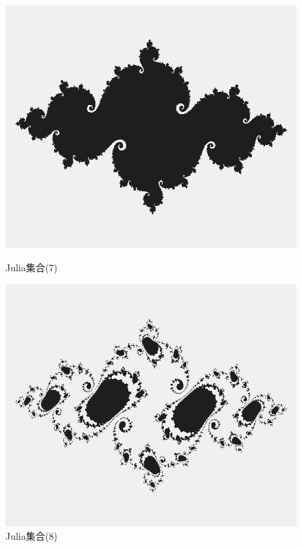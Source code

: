 \documentclass[dvipdfmx]{jsarticle}
\theoremstyle{definition}
\begin{document}
\begin{figure}[ht]
\begin{minipage}{0.5\hsize}
    \begin{center}
        \includegraphics[scale=0.21]{figure/julia_set7.png}
    \end{center}
    \caption{Julia集合(7)}
\end{minipage}
\begin{minipage}{0.49\hsize}
    \begin{center}
        \includegraphics[scale=0.21]{figure/julia_set8.png}
    \end{center}
    \caption{Julia集合(8)}
\end{minipage}
\end{figure}
\end{document}

